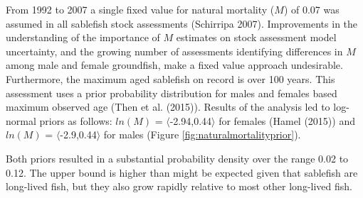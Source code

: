 \documentclass[11pt,
  english,
  a4paper,
]{article}
\begin{document}

From 1992 to 2007 a single fixed value for natural mortality ({\(M\)\leavevmode\tagmcend\tagstructend}) of 0.07 was assumed in all sablefish stock assessments {(Schirripa 2007)\leavevmode\tagmcend\tagstructend}. Improvements in the understanding of the importance of {\(M\)\leavevmode\tagmcend\tagstructend} estimates on stock assessment model uncertainty, and the growing number of assessments identifying differences in {\(M\)\leavevmode\tagmcend\tagstructend} among male and female groundfish, make a fixed value approach undesirable. Furthermore, the maximum aged sablefish on record is over 100 years. This assessment uses a prior probability distribution for males and females based maximum observed age ({Then et al. (2015)\leavevmode\tagmcend\tagstructend}). Results of the analysis led to log-normal priors as follows: {\(ln(M)\)\leavevmode\tagmcend\tagstructend} = {\(\langle\)\leavevmode\tagmcend\tagstructend}-2.94,0.44{\(\rangle\)\leavevmode\tagmcend\tagstructend} for females ({Hamel (2015)\leavevmode\tagmcend\tagstructend}) and {\(ln(M)\)\leavevmode\tagmcend\tagstructend} = {\(\langle\)\leavevmode\tagmcend\tagstructend}-2.9,0.44{\(\rangle\)\leavevmode\tagmcend\tagstructend} for males (Figure \ref{fig:naturalmortalityprior}).

\leavevmode\tagmcend\tagstructend\par


Both priors resulted in a substantial probability density over the range 0.02 to 0.12. The upper bound is higher than might be expected given that sablefish are long-lived fish, but they also grow rapidly relative to most other long-lived fish.

\leavevmode\tagmcend\tagstructend\par
\end{document}
